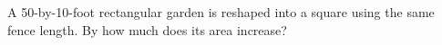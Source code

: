 A 50-by-10-foot rectangular garden is reshaped into a square using the same fence length. By how much does its area increase?
